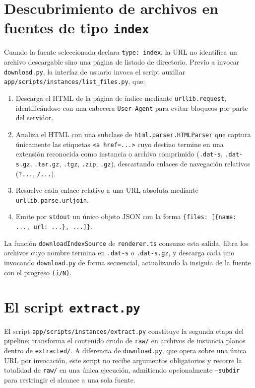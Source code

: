 \section{Descubrimiento de archivos en fuentes de tipo \texttt{index}}
\label{sec:cap3-index}

Cuando la fuente seleccionada declara \texttt{\textquotedbl type\textquotedbl: \textquotedbl index\textquotedbl}, la URL no
identifica un archivo descargable sino una p\'agina de listado de
directorio. Previo a invocar \texttt{download.py}, la interfaz de usuario
invoca el script auxiliar
\texttt{app/scripts/instances/list\_files.py}, que:

\begin{enumerate}
    \item Descarga el HTML de la p\'agina de \'indice mediante
    \texttt{urllib.request}, identific\'andose con una cabecera
    \texttt{User-Agent} para evitar bloqueos por parte del servidor.
    \item Analiza el HTML con una subclase de
    \texttt{html.parser.HTMLParser} que captura \'unicamente las etiquetas
    \texttt{<a href=\textquotedbl...\textquotedbl>} cuyo destino termine en una extensi\'on
    reconocida como instancia o archivo comprimido (\texttt{.dat-s},
    \texttt{.dat-s.gz}, \texttt{.tar.gz}, \texttt{.tgz}, \texttt{.zip},
    \texttt{.gz}), descartando enlaces de navegaci\'on relativos
    (\texttt{?...}, \texttt{/...}).
    \item Resuelve cada enlace relativo a una URL absoluta mediante
    \texttt{urllib.parse.urljoin}.
    \item Emite por \texttt{stdout} un \'unico objeto JSON con la forma
    \texttt{\{\textquotedbl files\textquotedbl: [\{\textquotedbl name\textquotedbl: ..., \textquotedbl url\textquotedbl: ...\}, ...]\}}.
\end{enumerate}

La funci\'on \texttt{downloadIndexSource} de \texttt{renderer.ts} consume
esta salida, filtra los archivos cuyo nombre termina en \texttt{.dat-s} o
\texttt{.dat-s.gz}, y descarga cada uno invocando \texttt{download.py} de
forma secuencial, actualizando la insignia de la fuente con el progreso
\texttt{(i/N)}.

\section{El script \texttt{extract.py}}
\label{sec:cap3-extract}

El script \texttt{app/scripts/instances/extract.py} constituye la segunda
etapa del pipeline: transforma el contenido crudo de \texttt{raw/} en
archivos de instancia planos dentro de \texttt{extracted/}. A diferencia de
\texttt{download.py}, que opera sobre una \'unica URL por invocaci\'on, este
script no recibe argumentos obligatorios y recorre la totalidad de
\texttt{raw/} en una \'unica ejecuci\'on, admitiendo opcionalmente
\texttt{--subdir} para restringir el alcance a una sola fuente.

